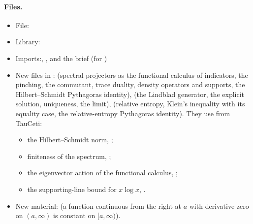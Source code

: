 \documentclass[11pt]{article}
\begin{document}
\paragraph{Files.}\leavevmode
\begin{itemize}
\item File: 
\item Library: 
\item Imports:\newline {},\newline
  ,\newline
  and the brief  (for )
\item New files in :  (spectral projectors
  as the functional calculus of indicators, the pinching, the commutant, trace duality, density
  operators and supports, the Hilbert--Schmidt Pythagoras identity),  (the
  Lindblad generator, the explicit solution, uniqueness, the limit), 
  (relative entropy, Klein's inequality with its equality case, the relative-entropy Pythagoras
  identity). They use from TauCeti:
  \begin{itemize}
  \item the Hilbert--Schmidt norm,
    ;
  \item finiteness of the spectrum,\newline
    ;
  \item the eigenvector action of the functional calculus,\newline
    ;
  \item the supporting-line bound for $x\log x$,
    .
  \end{itemize}
\item New  material:\newline
   (a function continuous from the right at
  $a$ with derivative zero on $(a, \infty)$ is constant on $[a, \infty)$).
\end{itemize}
\end{document}
